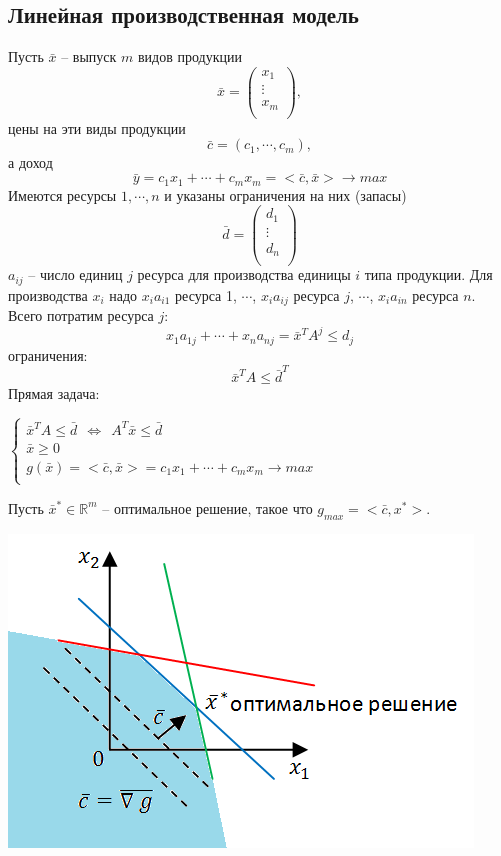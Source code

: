 \subsection{Линейная производственная модель}
Пусть $\bar x$ -- выпуск $m$ видов продукции
\[\bar x=\begin{pmatrix}
x_1\\
\vdots\\
x_m\\
\end{pmatrix},\]
цены на эти виды продукции $$\bar c =(c_1, \cdots, c_m),$$
а доход $$\bar y=c_1x_1+\cdots +c_mx_m=<\bar c, \bar x> \to max$$
Имеются ресурсы $1, \cdots, n$ и указаны ограничения на них (запасы)
\[\bar d=\begin{pmatrix}
d_1\\
\vdots\\
d_n\\
\end{pmatrix}\]
$a_{ij}$ -- число единиц $j$ ресурса для производства единицы $i$ типа продукции. Для производства $x_i$ надо $x_ia_{i1}$ ресурса 1, $\cdots$, $x_ia_{ij}$ ресурса $j$, $\cdots$, $x_ia_{in}$ ресурса $n$.\\
Всего потратим ресурса $j$: $$x_1a_{1j}+\cdots+x_na_{nj}=\bar x^T A^j \leqslant d_j$$
ограничения: $$\bar x^TA\leqslant\bar d^T$$
Прямая задача:
\begin{center}
    $
    \left\{
    \begin{array}{lcl}
    \bar x^TA\leqslant \bar d ~~\Leftrightarrow ~~A^T\bar x\leqslant \bar d\\
    \bar x \geqslant 0\\
    g(\bar x)=<\bar c, \bar x>=c_1x_1+\cdots+c_mx_m \to max\\
    \end{array}
    \right.
    $
\end{center}
Пусть $\bar x^*\in \mathbb{R}^m$ -- оптимальное решение, такое что $g_{max}=<\bar c, x^*>$.\\
\begin{center}
    \includegraphics[scale=0.84]{l18_3.png}\\
\end{center}
